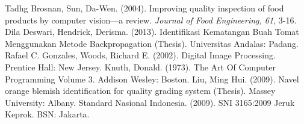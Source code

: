 \documentclass[laporan.tex]{subfiles}
\begin{document}
\begin{thebibliography}{99}
 Tadhg Brosnan, Sun, Da-Wen. (2004). Improving quality inspection of food products by computer vision––a review. \emph{Journal of Food Engineering, 61}, 3-16.
 Dila Deswari, Hendrick, Derisma. (2013). Identifikasi Kematangan Buah Tomat Menggunakan Metode Backpropagation (Thesis). Universitas Andalas: Padang.
 Rafael C. Gonzales, Woods, Richard E. (2002). Digital Image Processing. Prentice Hall: New Jersey.
 Knuth, Donald. (1973). The Art Of Computer Programming Volume 3. Addison Wesley: Boston.
 Liu, Ming Hui. (2009). Navel orange blemish identification for quality grading system (Thesis). Massey University: Albany.
 Standard Nasional Indonesia. (2009). SNI 3165:2009 Jeruk Keprok. BSN: Jakarta.
\end{thebibliography}
\end{document}

